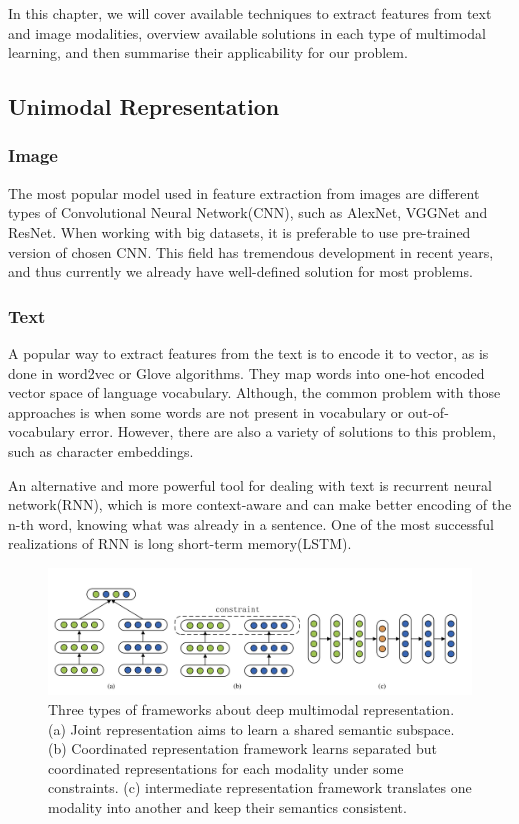 \documentclass[runningheads]{llncs}
\begin{document}
In this chapter, we will cover available techniques to extract features from text and image modalities, overview available solutions in each type of multimodal learning, and then summarise their applicability for our problem.

\subsection{Unimodal Representation}
\subsubsection{Image}
The most popular model used in feature extraction from images are different types of Convolutional Neural Network(CNN), such as AlexNet\cite{ref_AlexNet}, VGGNet\cite{ref_VGGNet} and ResNet\cite{ref_ResNet}. When working with big datasets, it is preferable to use pre-trained version of chosen CNN. This field has tremendous development in recent years, and thus currently we already have well-defined solution for most problems.

\subsubsection{Text}
A popular way to extract features from the text is to encode it to vector, as is done in word2vec\cite{ref_word2vec} or Glove\cite{ref_glove} algorithms. They map words into one-hot encoded vector space of language vocabulary. Although, the common problem with those approaches is when some words are not present in vocabulary or out-of-vocabulary error. However, there are also a variety of solutions to this problem, such as character embeddings\cite{ref_char_embeddings}. 

An alternative and more powerful tool for dealing with text is recurrent neural network(RNN)\cite{ref_rnn}, which is more context-aware and can make better encoding of the n-th word, knowing what was already in a sentence. One of the most successful realizations of RNN is long short-term memory(LSTM)\cite{ref_lstm}.

\begin{figure}
\includegraphics[width=\textwidth]{multimodal_learning_types.png}
\caption{Three types of frameworks about deep multimodal representation. (a) Joint representation aims to learn a shared semantic subspace.(b) Coordinated representation framework learns separated but coordinated representations for each modality under some constraints.
(c) intermediate representation framework translates one modality into another and keep their semantics consistent.\cite{ref_survey}} \label{fig1}
\end{figure}
\end{document}
